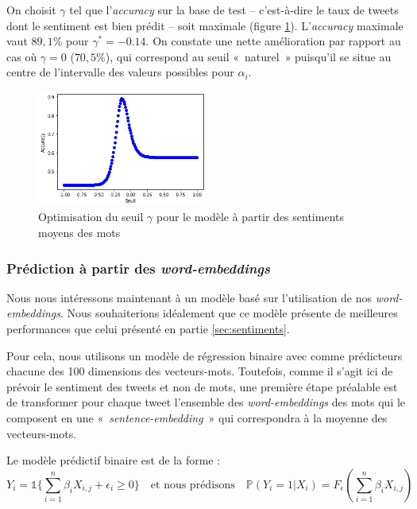 \documentclass[11pt,french,french]{article}
\begin{document}
On choisit \(\gamma\) tel que l'\emph{accuracy} sur la base de test --
c'est-à-dire le taux de tweets dont le sentiment est bien prédit -- soit
maximale (figure \ref{fig:max_baseline}). L'\emph{accuracy} maximale
vaut \(89,1 \%\) pour \(\gamma^* = -0.14\). On constate une nette
amélioration par rapport au cas où \(\gamma = 0\) (\(70,5 \%\)), qui
correspond au seuil «~naturel~» puisqu'il se situe au centre de
l'intervalle des valeurs possibles pour \(\alpha_i\).

\begin{figure}
\begin{center}
\includegraphics[width=0.5\textwidth]{img/max_baseline.png}
\captionsetup{margin=0cm,format=hang,justification=justified}
\caption{Optimisation du seuil $\gamma$ pour le modèle à partir des sentiments moyens des mots}\label{fig:max_baseline}
\end{center}
\end{figure}

\subsubsection{\texorpdfstring{Prédiction à partir des
\emph{word-embeddings}}{Prédiction à partir des word-embeddings}}\label{sec:wordembeddings}

Nous nous intéressons maintenant à un modèle basé sur l'utilisation de
nos \emph{word-embeddings}. Nous souhaiterions idéalement que ce modèle
présente de meilleures performances que celui présenté en partie
\ref{sec:sentiments}.

Pour cela, nous utilisons un modèle de régression binaire avec comme
prédicteurs chacune des 100 dimensions des vecteurs-mots. Toutefois,
comme il s'agit ici de prévoir le sentiment des tweets et non de mots,
une première étape préalable est de transformer pour chaque tweet
l'ensemble des \emph{word-embeddings} des mots qui le composent en une
«~\emph{sentence-embedding}~» qui correspondra à la moyenne des
vecteurs-mots.

Le modèle prédictif binaire est de la forme :
\[Y_i = \mathds{1}\{ \sum\limits_{i = 1}^n \beta_i X_{i,j} + \epsilon_i \geq 0 \} \quad \text{et nous prédisons} \quad  \mathbb{P}(Y_i = 1 | X_{i}) = F_{\epsilon}(\sum\limits_{i = 1}^n \beta_i X_{i,j})\]
\end{document}

